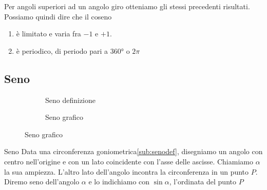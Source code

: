 Per angoli superiori ad un angolo giro otteniamo gli stessi precedenti risultati. 
Possiamo quindi dire che il coseno
\begin{enumerate}
	\item è limitato e varia fra $-1$ e $+1$.
	\item è periodico, di periodo pari a \ang{360} o $2\pi$
	\end{enumerate} 
\begin{figure}
		\centering

		\label{fig:AndamentoCoseno1}
	\end{figure}%
	\begin{figure}
		\centering

		\label{fig:AndamentoCoseno2}
\end{figure}
\subsection{Seno}
\label{sec:senogonio}
\begin{figure}
	\begin{subfigure}[b]{.5\linewidth}
		\centering
			
		\caption{Seno definizione}\label{sub:senodef}
	\end{subfigure}%
	\begin{subfigure}[b]{.5\linewidth}
		\centering
		
		\caption{Seno grafico}\label{sub:senograf}
	\end{subfigure}
	\label{tab:funseno}
\end{figure}
\begin{definizionet}{Seno}{}
	Data una circonferenza goniometrica\nobs\vref{sub:senodef}, disegniamo un angolo con centro nell'origine e con un lato coincidente con l'asse delle ascisse.  Chiamiamo  $\alpha$ la sua ampiezza. L'altro lato dell'angolo incontra la circonferenza in un punto $P$.  Diremo seno dell'angolo $\alpha$ e lo indichiamo con $\sin\alpha$, l'ordinata del punto $P$
\end{definizionet}
